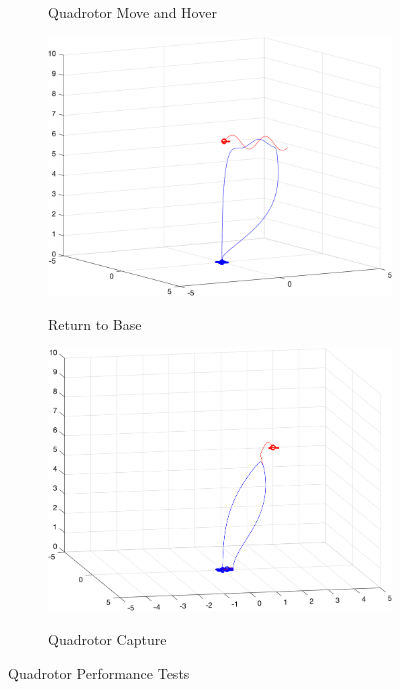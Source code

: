 \documentclass{article}
\begin{document}
\begin{multicols}{2}
\begin{figure}[H]
\begin{subfigure}[b]{0.31\textwidth}
     \label{fig:MandH}
     \caption{Quadrotor Move and Hover}
\end{subfigure}
\begin{subfigure}[b]{0.31\textwidth}
    \centering
    \includegraphics[width = 1\textwidth]{images/ReturnToBase.png}
     \label{fig:Return}
     \caption{Return to Base}
 \end{subfigure}
\begin{subfigure}[b]{0.31\textwidth}
    \centering
    \includegraphics[width = 1\textwidth]{images/Intercept.png}
     \label{fig:Capture}
     \caption{Quadrotor Capture}
 \end{subfigure}
   \caption{Quadrotor Performance Tests}
\end{figure}


\end{multicols}
\end{document}
